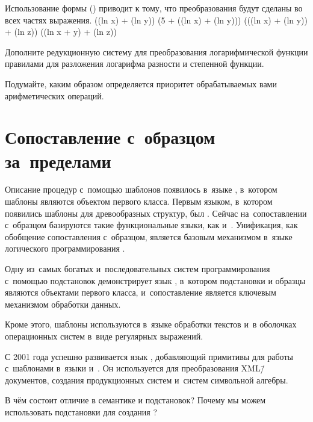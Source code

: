 Использование формы  () приводит к тому, что преобразования будут сделаны во всех частях выражения.
     {((ln x) + (ln y))}
     {(5 + ((ln x) + (ln y)))}
     {(((ln x) + (ln y)) + (ln z))}
     {((ln x + y) + (ln z))}

\begin{Assignment}
Дополните редукционную систему для преобразования логарифмической функции правилами для разложения логарифма разности и степенной функции.

Подумайте, каким образом определяется приоритет обрабатываемых вами арифметических операций.
\end{Assignment}

\section[4]{Сопоставление с~образцом \mbox{за~пределами~\Scheme}}%
Описание процедур с~помощью шаблонов появилось в~языке , в~котором шаблоны являются объектом первого класса. Первым языком, в~котором появились шаблоны для древообразных структур, был \Lisp. Сейчас на~сопоставлении с~образцом базируются такие функциональные языки, как  и~.
Унификация, как обобщение сопоставления с~образцом, является базовым механизмом в~языке логического программирования .

Одну из~самых богатых и~последовательных систем программирования с~помощью подстановок демонстрирует язык , в~котором подстановки и образцы являются объектами первого класса, и~сопоставление является ключевым механизмом обработки данных.

Кроме этого, шаблоны используются в~языке обработки текстов  и~в оболочках операционных систем в~виде регулярных выражений.

С 2001 года успешно развивается язык , добавляющий примитивы для работы с~шаблонами в~языки  и~. Он используется для преобразования XML\=/документов, создания продукционных систем и~систем символьной алгебры.

\begin{Queeze}
 \item В чём состоит отличие в семантике  и подстановок? Почему мы можем использовать подстановки для создания ?
\end{Queeze}
